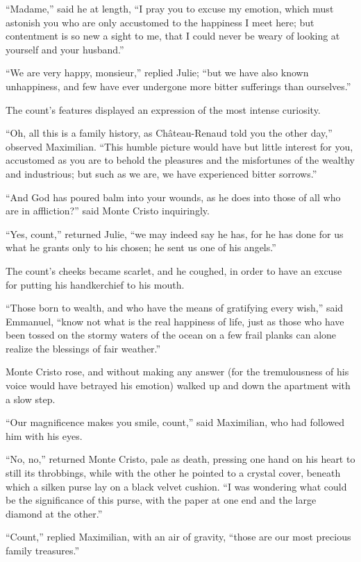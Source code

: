 “Madame,” said he at length, “I pray you to excuse my emotion, which
must astonish you who are only accustomed to the happiness I meet here;
but contentment is so new a sight to me, that I could never be weary of
looking at yourself and your husband.”

“We are very happy, monsieur,” replied Julie; “but we have also known
unhappiness, and few have ever undergone more bitter sufferings than
ourselves.”

The count’s features displayed an expression of the most intense
curiosity.

“Oh, all this is a family history, as Château-Renaud told you the other
day,” observed Maximilian. “This humble picture would have but little
interest for you, accustomed as you are to behold the pleasures and the
misfortunes of the wealthy and industrious; but such as we are, we have
experienced bitter sorrows.”

“And God has poured balm into your wounds, as he does into those of all
who are in affliction?” said Monte Cristo inquiringly.

“Yes, count,” returned Julie, “we may indeed say he has, for he has
done for us what he grants only to his chosen; he sent us one of his
angels.”

The count’s cheeks became scarlet, and he coughed, in order to have an
excuse for putting his handkerchief to his mouth.

“Those born to wealth, and who have the means of gratifying every
wish,” said Emmanuel, “know not what is the real happiness of life,
just as those who have been tossed on the stormy waters of the ocean on
a few frail planks can alone realize the blessings of fair weather.”

Monte Cristo rose, and without making any answer (for the tremulousness
of his voice would have betrayed his emotion) walked up and down the
apartment with a slow step.

“Our magnificence makes you smile, count,” said Maximilian, who had
followed him with his eyes.

“No, no,” returned Monte Cristo, pale as death, pressing one hand on
his heart to still its throbbings, while with the other he pointed to a
crystal cover, beneath which a silken purse lay on a black velvet
cushion. “I was wondering what could be the significance of this purse,
with the paper at one end and the large diamond at the other.”

“Count,” replied Maximilian, with an air of gravity, “those are our
most precious family treasures.”

